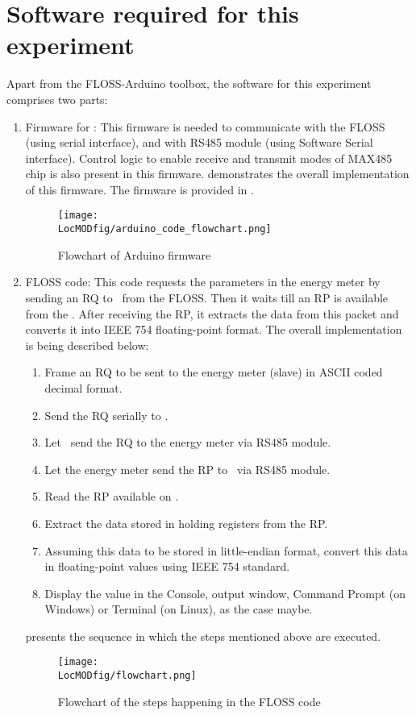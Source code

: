 \section{Software required for this experiment}
Apart from the FLOSS-Arduino toolbox, the software for this experiment comprises two parts:
\begin{enumerate}
\item  Firmware for \arduino: This firmware is needed to communicate
with the FLOSS (using serial interface), and with RS485 module (using
Software Serial interface). Control logic to enable receive and
transmit modes of MAX485 chip is also present in this firmware.  demonstrates the overall implementation of this firmware. The firmware is provided in . 

\begin{figure}
  \centering
  \texttt{[image: \\LocMODfig/arduino\_code\_flowchart.png]}
  \caption{Flowchart of Arduino firmware}
  \label{fig:modbus-firmware}
\end{figure}

\item FLOSS code: This code requests the parameters in the energy meter
by sending an RQ to \arduino\ from the FLOSS. Then it waits till
an RP is available from the \arduino. After receiving the RP, it extracts 
the data from this packet and converts it into IEEE
754 floating-point format. The overall implementation is being
described below:
\begin {enumerate}
\item Frame an RQ to be sent to the energy meter (slave) in ASCII coded decimal
format. 
\item Send the RQ serially to \arduino. 
\item Let \arduino\ send the RQ to the energy meter via RS485 module. 
\item Let the energy meter send the RP to \arduino\ via RS485 module. 
\item Read the RP available on \arduino. 
\item Extract the data stored in holding registers from the RP. 
\item Assuming this data to be stored in little-endian format, 
convert this data in floating-point values using IEEE 754 standard. 
\item Display the value in the Console, output window, Command Prompt (on Windows) or Terminal (on Linux), as the case maybe.  
\end{enumerate}
 presents the sequence in which the steps mentioned above are executed. 
\begin{figure}
  \centering
  \texttt{[image: \\LocMODfig/flowchart.png]}
  \caption{Flowchart of the steps happening in the FLOSS code}
  \label{fig:flow-chart}
\end{figure}

\end{enumerate}

